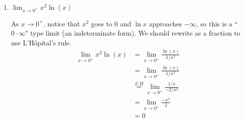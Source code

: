 \documentclass{article}
\begin{document}
\begin{enumerate}
\begin{enumerate}
    \begin{solution}
      The dominant terms in the numerator and denominator are $x$ and $5x^2$, respectively. This means that we can replace our limit with one that's easier to evaluate.
      \begin{align*}
      \lim_{x \to \infty} \frac{x + \ln x}{5x^2+300} 
      &= \lim_{x \to \infty} \frac{x}{5x^2} \\
      &=  \lim_{x \to \infty} \frac{1}{5x} \\
      &= \boxed{0}
      \end{align*}
    \end{solution}


  \item
    \begin{problem}
      $\displaystyle \lim_{x \to 0^+} x^2\ln(x) $
    \end{problem}
\pspace{\vfill}


    \begin{solution}      
   As $x \to 0^{+}$, notice that $x^2$ goes to $0$ and $\ln x$ approaches $-\infty$, so this is a ``$0 \cdot \infty$" type limit (an indeterminate form). We should rewrite as a fraction to use L'Hôpital's rule. 
   \begin{align*}
\lim_{x \to 0^+} x^2\ln(x) &= \lim_{x \to 0^+} \frac{\ln(x)}{1/x^2}\\
&= \lim_{x \to 0^+} \frac{\ln(x)}{1/x^2} \\
&\stackrel{L'H}{=}
\lim_{x \to 0^+} \frac{1/x}{-2/x^3} \\
&= \lim_{x \to 0^+} \frac{-x^2}{2} \\
&= \boxed{0}
\end{align*}

    \end{solution}





\end{enumerate}
\end{enumerate}
\end{document}
